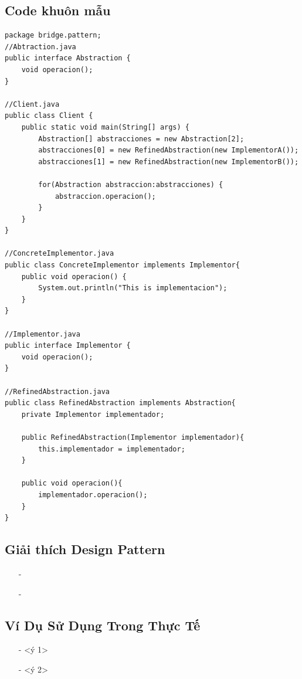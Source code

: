 \documentclass{article}
\newcommand\subpara{\fontsize{13}{13}\selectfont \fontseries{b}\selectfont}
\begin{document}
		\subsection{Code khuôn mẫu}
		\begin{lstlisting}
package bridge.pattern;
//Abtraction.java
public interface Abstraction {
	void operacion();
}

//Client.java
public class Client {
	public static void main(String[] args) {
        Abstraction[] abstracciones = new Abstraction[2];
        abstracciones[0] = new RefinedAbstraction(new ImplementorA());
        abstracciones[1] = new RefinedAbstraction(new ImplementorB());

        for(Abstraction abstraccion:abstracciones) {
            abstraccion.operacion();
        }
    }
}

//ConcreteImplementor.java
public class ConcreteImplementor implements Implementor{
	public void operacion() {
        System.out.println("This is implementacion");
    }
}

//Implementor.java
public interface Implementor {
	void operacion();
}

//RefinedAbstraction.java
public class RefinedAbstraction implements Abstraction{
    private Implementor implementador;

    public RefinedAbstraction(Implementor implementador){
        this.implementador = implementador;
    }

    public void operacion(){
        implementador.operacion();
    }
}
        \end{lstlisting}

		\subsection{Giải thích Design Pattern}
		\begin{itemize}
			\item[-]\subpara{Theo Mô hình ct}
			\item[-]\subpara{Theo code minh họa}
		\end{itemize}

		\subsection{Ví Dụ Sử Dụng Trong Thực Tế}
\begin{itemize}
            \item[-]\subpara{}<ý 1>
            \item[-]\subpara{}<ý 2>
        \end{itemize}
		\pagebreak
\end{document}
